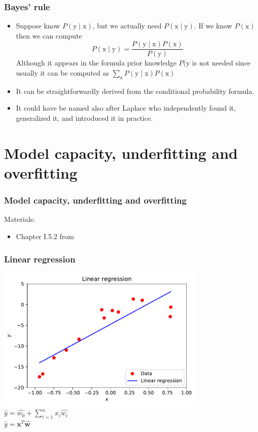 \documentclass[notes]{beamer}          %
\newcommand{\vect}[1]{\bm{#1}}
\begin{document}
\begin{frame}
\frametitle{Bayes' rule}
\begin{itemize}
    \item Suppose know $P(\text{y} \mid \text{x})$, but we actually need $P(\text{x} \mid \text{y})$. If we know $P(\text{x})$ then we can compute
    $$
        P(\text{x} \mid \text{y}) = \frac{P(\text{y} \mid \text{x})P(\text{x})}{P(\text{y})}
    $$
    Although it appears in the formula prior knowledge $P(\text{y}$ is not needed since usually it can be computed as $\sum_{\text{x}} P(\text{y} \mid \text{x})P(\text{x})$
    \item It can be straightforwardly derived from the conditional probability formula.
    \item It could have be named also after Laplace who independently found it, generalized it, and introduced it in practice.
\end{itemize}
\end{frame}

\fi %


\section{Model capacity, underfitting and overfitting}

\begin{frame}
\frametitle{Model capacity, underfitting and overfitting}
Materials:
\begin{itemize}
    \item Chapter I.5.2 from \cite{deeplearning}
\end{itemize}
\end{frame}

\begin{frame}
\frametitle{Linear regression}
    \begin{center}
            \includegraphics[width=0.75\textwidth]{../figures/week_1/linear_regression.pdf} \\
            $\hat{y} = \hat{w_0} + \sum_{i=1}^{n} x_i \hat{w_i}$ \\
            $\hat{y} = \vect{x}^T \hat{\vect{w}}$
    \end{center}
\end{frame}
\end{document}
